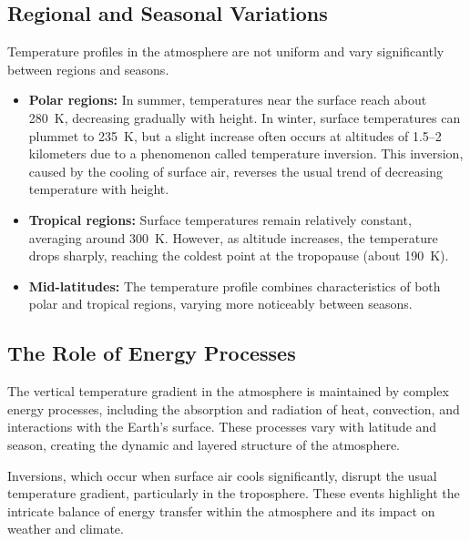 \subsection*{Regional and Seasonal Variations}

Temperature profiles in the atmosphere are not uniform and vary significantly between regions and seasons.

\begin{itemize}
	\item \textbf{Polar regions:} In summer, temperatures near the surface reach about 280~K, decreasing gradually with height. In winter, surface temperatures can plummet to 235~K, but a slight increase often occurs at altitudes of 1.5--2 kilometers due to a phenomenon called temperature inversion. This inversion, caused by the cooling of surface air, reverses the usual trend of decreasing temperature with height.
	\item \textbf{Tropical regions:} Surface temperatures remain relatively constant, averaging around 300~K. However, as altitude increases, the temperature drops sharply, reaching the coldest point at the tropopause (about 190~K).
	\item \textbf{Mid-latitudes:} The temperature profile combines characteristics of both polar and tropical regions, varying more noticeably between seasons.
\end{itemize}

\subsection*{The Role of Energy Processes}

The vertical temperature gradient in the atmosphere is maintained by complex energy processes, including the absorption and radiation of heat, convection, and interactions with the Earth's surface. These processes vary with latitude and season, creating the dynamic and layered structure of the atmosphere.

Inversions, which occur when surface air cools significantly, disrupt the usual temperature gradient, particularly in the troposphere. These events highlight the intricate balance of energy transfer within the atmosphere and its impact on weather and climate.


